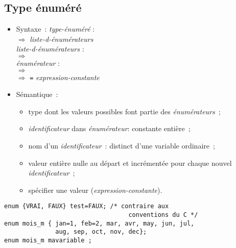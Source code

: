 \begin{frame}[fragile]
  \section{Type \'enum\'er\'e}
\begin{itemize}
  \item Syntaxe~:
{\it type-\'enum\'er\'e} : \\
\quad $\Rightarrow$ \;{\tt \{} {\it
  liste-d-\'enum\'erateurs}\;{\tt \}}  \\
{\it liste-d-\'enum\'erateurs} : \\
\hspace*{10mm} $\Rightarrow$ \hspace{3mm}{\it \'enum\'erateur} \\ 
{\it \'enum\'erateur} : \\
\hspace*{10mm} $\Rightarrow$ \hspace{3mm}{\it identificateur} \\
\hspace*{10mm} $\Rightarrow$ \hspace{3mm}{\it identificateur} {\tt =}
{\it expression-constante}
\newpage
  \item S\'emantique~:
    \begin{itemize}
      \item type dont les valeurs possibles font partie des {\it
          \'enum\'erateurs}~;
      \item {\it identificateur} dans {\it \'enum\'erateur}: constante enti\`ere~;
      \item nom d'un {\it identificateur}~: distinct d'une variable
        ordinaire~;
      \item valeur enti\`ere nulle au d\'epart et incr\'ement\'ee pour chaque
        nouvel {\it identificateur}~;
      \item sp\'ecifier une valeur ({\it expression-constante}).
    \end{itemize}
  \end{itemize}
\begin{verbatim}
enum {VRAI, FAUX} test=FAUX; /* contraire aux
                                  conventions du C */ 
enum mois_m { jan=1, feb=2, mar, avr, may, jun, jul,
              aug, sep, oct, nov, dec};  
enum mois_m mavariable ;
\end{verbatim}
\end{frame}
